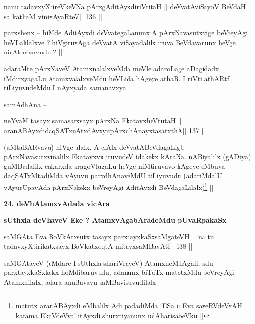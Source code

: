 \begin{shl}
nanu tadavxyXtireVkeVNa pArxgAditAyxdiriVritaH ||
deVvatAviSayoV BeVdaH sa kathaM vinivAyaRteV\hfill || 136 ||
\end{shl}

\begin{artha}
parxshenx -- hiMde AditAyxdi deVvategaLanunx A pArxNavasutxvige beVreyAgi heVLalilalxve ? hiVgiruvAga deVvatA viSayadalilx iruva BeVdavanunx heVge nirAkarisuvudu ? ||
\end{artha}

\begin{artha}
adaraMte pArxNaveV AtamxnalalxveMda meVle adaroLage aDagidadx 
iMdirxyagaLu AtamxvalalxveMdu heVLida hAgeye athaR. I riVti athARtf tiLiyuvudeMdu I nAyxyada samanavxya |
\end{artha}

\begin{artha}
samAdhAna --
\end{artha}

\begin{shl}
neYvaM tasayx samasatxsayx pArxNa EkatavxheVtutaH ||
aranABAyxdidaqSATxnAtxdAvxyupArxdhAnayxtasatxthA\hfill || 137 ||
\end{shl}

\begin{artha}
(aMtaBARvavu) hiVge alalx. A elAlx deVvatABeVdagaLigU 
pArxNavasutxvinalilx Ekatavxvu iruvudeV idakekx kAraNa. nABiyalilx 
(gADiya) guMBadalilx cakarxda aragoVlugaLu heVge niMtiruvavo hAgeye 
eMbuva daqSATxMtadiMda vAyuvu parxdhAnaveMdU tiLiyuvudu (adariMdalU 
vAyurUpavAda pArxNakekx beVreyAgi AditAyxdi 
BeVdagaLilalx)\footnote{matutx aranABAyxdi eMbalilx Adi padadiMda `ESa 
u Eva saveRVdeVvAH
 katama EkoVdeVva' itAyxdi shurxtiyanunx udAharisabeVku ||} ||
\end{artha}

\begin{artha}
{\bf 24. deVhAtamxvAdada vicAra}

{\bf sUthxla deVhaveV Eke ? AtamxvAgabAradeMdu pUvaRpakaSx ---}
\end{artha}

\begin{shl}
saMGAta Eva BoVkAtx\s sutx tasayx parxtayxkaSxsaMgateVH ||
na tu tadavxyXtirikatxsayx BoVkatxqqtA mitayxsaMBavAtf\hfill || 138 ||
\end{shl}

\begin{artha}
saMGAtaveV (eMdare I sUthxla shariVraveV) AtamxneMdAgali, adu 
parxtayxkaSxkekx hoMdibaruvudu, adanunx biTuTx matotxMdu beVreyAgi Atamxnilalx, adara anuBavavu saMBavisuvudilalx ||
\end{artha}

